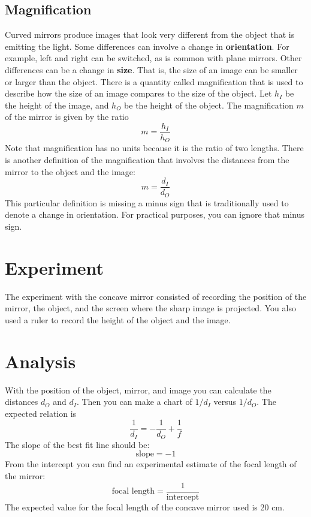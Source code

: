 \subsection{Magnification}
%
Curved mirrors produce images that look very different from the object that is emitting the light. Some differences can involve a change in \textbf{orientation}. For example, left and right can be switched, as is common with plane mirrors. Other differences can be a change in \textbf{size}. That is, the size of an image can be smaller or larger than the object. There is a quantity called magnification that is used to describe how the size of an image compares to the size of the object. Let $h_{I}$ be the height of the image, and $h_{O}$ be the height of the object. The magnification $m$ of the mirror is given by the ratio
\begin{equation}
    m = \frac{h_{I}}{h_{O}}
\end{equation}
Note that magnification has no units because it is the ratio of two lengths. There is another definition of the magnification that involves the distances from the mirror to the object and the image:
\begin{equation}
    m = \frac{d_{I}}{d_{O}}
\end{equation}
This particular definition is missing a minus sign that is traditionally used to denote a change in orientation. For practical purposes, you can ignore that minus sign.
%
\section{Experiment}
%
The experiment with the concave mirror consisted of recording the position of the mirror, the object, and the screen where the sharp image is projected. You also used a ruler to record the height of the object and the image.
%
\section{Analysis}
%
With the position of the object, mirror, and image you can calculate the distances $d_{O}$ and $d_{I}$. Then you can make a chart of $1 / d_{I}$ versus $1 / d_{O}$. The expected relation is
\begin{equation}
    \frac{1}{d_{I}} = -\frac{1}{d_{O}} + \frac{1}{f}
\end{equation}
The slope of the best fit line should be:
\begin{equation}
    \text{slope} = -1
\end{equation}
From the intercept you can find an experimental estimate of the focal length of the mirror:
\begin{equation}
    \text{focal length} = \frac{1}{\text{intercept}}
\end{equation}
The expected value for the focal length of the concave mirror used is 20 cm.


